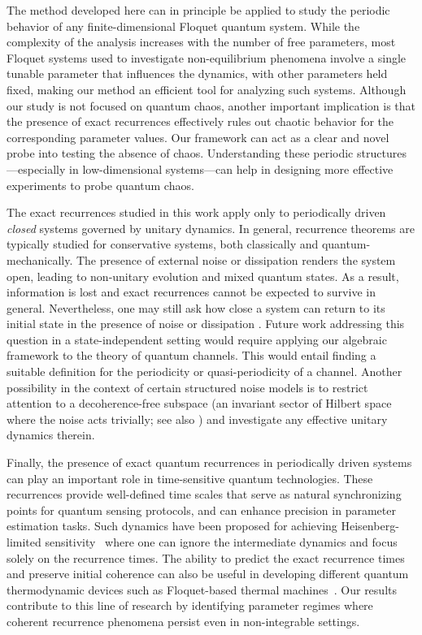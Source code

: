 \documentclass[a4paper,onecolumn,accepted=2026-04-08,10pt]{quantumarticle}
\theoremstyle{definition}
\begin{document}
The method developed here can in principle be applied to study the periodic behavior of any finite-dimensional Floquet quantum system. While the complexity of the analysis increases with the number of free parameters, most Floquet systems used to investigate non-equilibrium phenomena involve a single tunable parameter that influences the dynamics, with other parameters held fixed, making our method an efficient tool for analyzing such systems. 
Although our study is not focused on quantum chaos, another important implication is that the presence of exact recurrences effectively rules out chaotic behavior for the corresponding parameter values.
Our framework can act as a clear and novel probe into testing the absence of chaos.
Understanding these periodic structures—especially in low-dimensional systems—can help in designing more effective experiments to probe quantum chaos. 

The exact recurrences studied in this work apply only to periodically driven \textit{closed} systems governed by unitary dynamics. In general, recurrence theorems are typically studied for conservative systems, both classically and quantum-mechanically. 
The presence of external noise or dissipation renders the system open, leading to non-unitary evolution and mixed quantum states. As a result, information is lost and exact recurrences cannot be expected to survive in general.
Nevertheless, one may still ask how close a system can return to its initial state in the presence of noise or dissipation \cite{liu_recurrence_open_quantum_2024}. 
Future work addressing this question in a state-independent setting would require applying our algebraic framework to the theory of quantum channels.  This would entail finding a suitable definition for the periodicity or quasi-periodicity of a channel.  Another possibility in the context of certain structured noise models is to restrict attention to a decoherence-free subspace (an invariant sector of Hilbert space where the noise acts trivially; see also \cite{Bartlett_superselection_2007}) and investigate any effective unitary dynamics therein.


Finally, the presence of exact quantum recurrences in periodically driven systems can play an important role in time-sensitive quantum technologies. These recurrences provide well-defined time scales that 
serve as natural synchronizing points for quantum sensing protocols, and can enhance precision in parameter estimation tasks. Such dynamics have been proposed for achieving Heisenberg-limited sensitivity~\cite{zou_2025_enhancing,biswas_2025_the} where one can ignore the intermediate dynamics and focus solely on the recurrence times. The ability to predict the exact recurrence times and preserve initial coherence can also be useful in developing different quantum thermodynamic devices such as Floquet-based thermal machines~\cite{ronnie_thrermo_2013,scopa_lindbladfloquet_2018}. Our results contribute to this line of research by identifying parameter regimes where coherent recurrence phenomena persist even in non-integrable settings.
\end{document}
